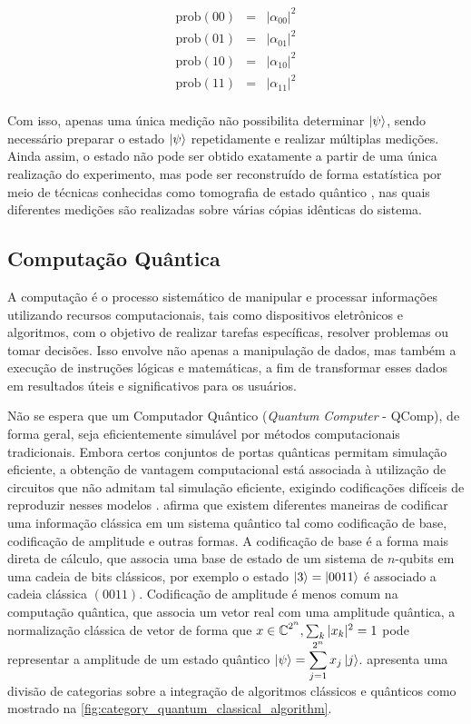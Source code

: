     $$
        \begin{array}{lcl}
             \text{prob}(00) & = &|\alpha_{00}|^2 \\
             \text{prob}(01) & = &|\alpha_{01}|^2 \\
             \text{prob}(10) & = &|\alpha_{10}|^2 \\
             \text{prob}(11) & = &|\alpha_{11}|^2 \\
        \end{array} 
    $$

Com isso, apenas uma única medição não possibilita determinar $\ket{\psi}$, sendo necessário preparar o estado $\ket{\psi}$ repetidamente e realizar múltiplas medições. {\red Ainda assim, o estado não pode ser obtido exatamente a partir de uma única realização do experimento, mas pode ser reconstruído de forma estatística por meio de técnicas conhecidas como tomografia de estado quântico \cite{james2001measurement}, nas quais diferentes medições são realizadas sobre várias cópias idênticas do sistema.}

\subsection{Computação Quântica}

A computação é o processo sistemático de manipular e processar informações utilizando recursos computacionais, tais como dispositivos eletrônicos e algoritmos, com o objetivo de realizar tarefas específicas, resolver problemas ou tomar decisões. Isso envolve não apenas a manipulação de dados, mas também a execução de instruções lógicas e matemáticas, a fim de transformar esses dados em resultados úteis e significativos para os usuários.

Não se espera que um Computador Quântico (\textit{Quantum Computer} - QComp), de forma geral, seja eficientemente simulável por métodos computacionais tradicionais. Embora certos conjuntos de portas quânticas permitam simulação eficiente, a obtenção de vantagem computacional está associada à utilização de circuitos que não admitam tal simulação eficiente, exigindo codificações difíceis de reproduzir nesses modelos \cite{havlicekSupervisedLearningQuantumenhanced2019}. \textcite{Schuld_Petruccione_2018} afirma que existem diferentes maneiras de codificar uma informação clássica em um sistema quântico tal como codificação de base, codificação de amplitude e outras formas. A codificação de base é a forma mais direta de cálculo, que associa uma base de estado de um sistema de $n$-qubits em uma cadeia de bits clássicos, por exemplo o estado $\ket{3}=\ket{0011}$ é associado a cadeia clássica $(0011)$. Codificação de amplitude é menos comum na computação quântica, que associa um vetor real com uma amplitude quântica, a normalização clássica de vetor de forma que $x\in\operatorname{\mathbb{C}}^{2^n}, \sum_k|x_k|^2=1$ pode representar a  amplitude de um estado quântico $\ket{\psi}=\displaystyle\sum_{j=1}^{2^n}x_j\ket{j}$. \textcite{houssein_machine_2022} apresenta uma divisão de categorias sobre a integração de algoritmos clássicos e quânticos como mostrado na \autoref{fig:category_quantum_classical_algorithm}.


